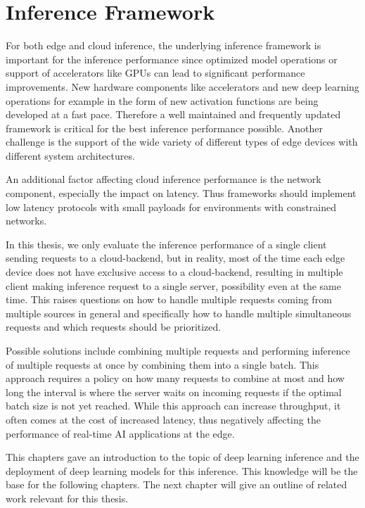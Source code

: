 \section{Inference Framework}
For both edge and cloud inference, the underlying inference framework is important for the inference performance since optimized model operations or support of accelerators like GPUs can lead to significant performance improvements.
New hardware components like accelerators and new deep learning operations for example in the form of new activation functions are being developed at a fast pace. Therefore a well maintained and frequently updated framework is critical for the best inference performance possible.
Another challenge is the support of the wide variety of different types of edge devices with different system architectures.

An additional factor affecting cloud inference performance is the network component, especially the impact on latency.
Thus frameworks should implement low latency protocols with small payloads for environments with constrained networks.

In this thesis, we only evaluate the inference performance of a single client sending requests to a cloud-backend, but in reality, most of the time each edge device does not have exclusive access to a cloud-backend, resulting in multiple client making inference request to a single server, possibility even at the same time.
This raises questions on how to handle multiple requests coming from multiple sources in general and specifically how to handle multiple simultaneous requests and which requests should be prioritized.

Possible solutions include combining multiple requests and performing inference of multiple requests at once by combining them into a single batch.
This approach requires a policy on how many requests to combine at most and how long the interval is where the server waits on incoming requests if the optimal batch size is not yet reached. 
While this approach can increase throughput, it often comes at the cost of increased latency, thus negatively affecting the performance of real-time AI applications at the edge.


\vspace{0.5cm}
This chapters gave an introduction to the topic of deep learning inference and the deployment of deep learning models for this inference.
This knowledge will be the base for the following chapters.
The next chapter will give an outline of related work relevant for this thesis.


